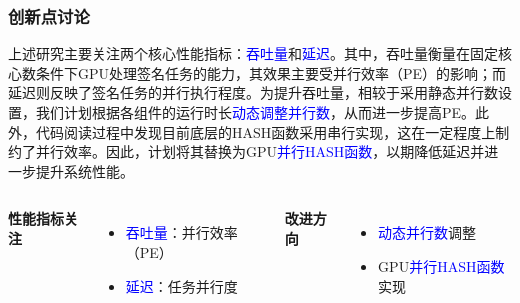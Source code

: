 \documentclass[slide]{../../custom}
\begin{document}
\begin{frame}
  \frametitle{创新点讨论}
  上述研究主要关注两个核心性能指标：\textcolor{blue}{吞吐量}和\textcolor{blue}{延迟}。其中，吞吐量衡量在固定核心数条件下GPU处理签名任务的能力，其效果主要受并行效率（PE）的影响；而延迟则反映了签名任务的并行执行程度。为提升吞吐量，相较于采用静态并行数设置，我们计划根据各组件的运行时长\textcolor{blue}{动态调整并行数}，从而进一步提高PE。此外，代码阅读过程中发现目前底层的HASH函数采用串行实现，这在一定程度上制约了并行效率。因此，计划将其替换为GPU\textcolor{blue}{并行HASH函数}，以期降低延迟并进一步提升系统性能。
  \vfill
  \begin{columns}
    \textbf{性能指标关注}
    \begin{itemize}
      \item \textcolor{blue}{吞吐量}：并行效率（PE）
      \item \textcolor{blue}{延迟}：任务并行度
    \end{itemize}

    \textbf{改进方向}
    \begin{itemize}
      \item \textcolor{blue}{动态并行数}调整
      \item GPU\textcolor{blue}{并行HASH函数}实现
    \end{itemize}
  \end{columns}
\end{frame}
\end{document}
